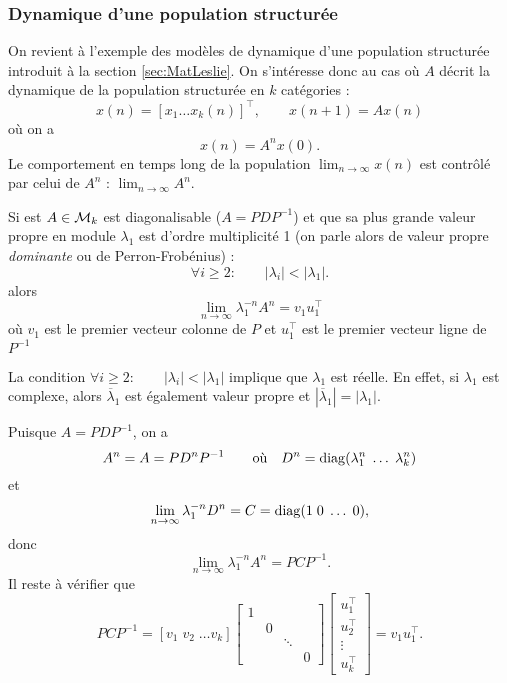 \subsubsection{Dynamique d'une population structurée}

On revient à l'exemple des modèles de dynamique d'une population structurée introduit à la section \ref{sec:MatLeslie}. On s'intéresse donc au cas où $A$ décrit la dynamique de la population structurée en $k$ catégories : 
$$
x(n) = [x_1 \dots x_k(n)]^\top, \qquad x(n+1) = A x(n)
$$
où on a
$$
x(n) = A^n x(0).
$$
Le comportement en temps long de la population $\lim_{n \to\infty} x(n)$ est contrôlé par celui de $A^n$ : $\lim_{n \to\infty} A^n$.

\begin{proposition}
  Si est $A \in \mathcal{M}_k$ est diagonalisable ($A = P D P^{-1}$) et que sa plus grande valeur propre en module $\lambda_1$ est d'ordre multiplicité 1 (on parle alors de valeur propre {\em dominante} ou de Perron-Frobénius) :
  $$
  \forall i \geq 2: \qquad |\lambda_i| < |\lambda_1|.
  $$
  alors
  $$
  \lim_{n \to \infty} \lambda_1^{-n} A^n = v_1 u_1^\top
  $$
  où $v_1$ est le premier vecteur colonne de $P$ et $u_1^\top$ est le premier vecteur ligne de $P^{-1}$
\end{proposition}

\remark
La condition $\forall i \geq 2: \qquad |\lambda_i| < |\lambda_1|$ implique que $\lambda_1$ est réelle. En effet, si $\lambda_1$ est complexe, alors $\overline{\lambda}_1$ est également valeur propre et $|\overline{\lambda}_1| = |\lambda_1|$.

\proof
  Puisque $A = P D P^{-1}$, on a
  $$
  A^n = A = P D^n P^{-1}
  \qquad \text{où} \quad 
  D^n = \operatorname{diag}(\lambda_1^n \; \dots \; \lambda_k^n)
  $$
  et 
  $$
  \lim_{n \to \infty} \lambda_1^{-n} D^n = C = \operatorname{diag}(1 \; 0 \; \dots \; 0),
  $$
  donc
  $$
  \lim_{n \to \infty} \lambda_1^{-n} A^n = P C P^{-1}.
  $$
  Il reste à vérifier que
  $$
  P C P^{-1} 
  = \left[v_1 \; v_2 \; \dots v_k\right] 
  \left[\begin{array}{cccc} 1 & & & \\ & 0 & & \\ & & \ddots & \\ & & & 0 \end{array} \right] 
  \left[\begin{array}{c} u_1^\top \\ u_2^\top \\ \vdots \\ u_k^\top \end{array}\right] 
  = v_1 u_1^\top .
  $$
\eproof

